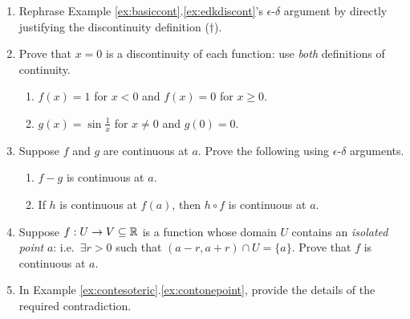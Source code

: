 \begin{exercises}{}{}
\begin{enumerate}
	  
	  \item Rephrase Example \ref*{ex:basiccont}.\ref{ex:edkdiscont}'s $\epsilon$-$\delta$ argument by directly justifying the discontinuity definition ($\dag$).
	  	  

		\item Prove that $x=0$ is a discontinuity of each function: use \emph{both} definitions of continuity.
		\begin{enumerate}
	  	\item $f(x)=1$ for $x<0$ and $f(x)=0$ for $x\ge 0$.
	  	\item $g(x)=\sin\frac 1x$ for $x\neq 0$ and $g(0)=0$.
		\end{enumerate}
	
	
		\item Suppose $f$ and $g$ are continuous at $a$. Prove the following using $\epsilon$-$\delta$ arguments.
		\begin{enumerate}
	  	\item $f-g$ is continuous at $a$.
	  	\item If $h$ is continuous at $f(a)$, then $h\circ f$ is continuous at $a$.
		\end{enumerate}
		
	  
	
		
	  \item Suppose $f:U\to V\subseteq\mathbb{R}$ is a function whose domain $U$ contains an \emph{isolated point} $a$: i.e.\ $\exists r>0$ such that $(a-r,a+r)\cap U=\{a\}$. Prove that $f$ is continuous at $a$.
	  
	
		\item In Example \ref*{ex:contesoteric}.\ref{ex:contonepoint}, provide the details of the required contradiction.
	

\end{enumerate}
\end{exercises}
